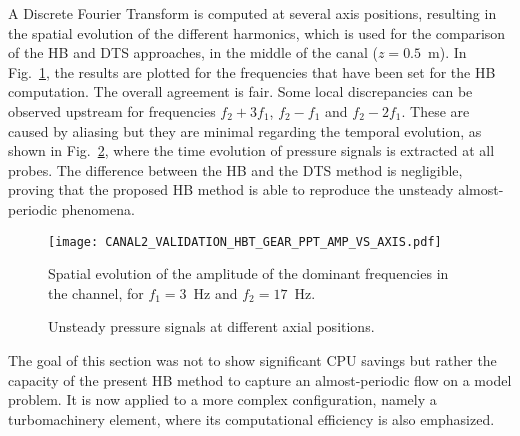 A Discrete Fourier Transform is computed at several axis positions,
resulting in the spatial evolution of the different harmonics, which
is used for the comparison of the HB and DTS approaches, in the middle
of the canal ($z = 0.5$~m).  In
Fig.~\ref{fig:canal2_validation_hbt_gear_amp_vs_axis}, the results are
plotted for the frequencies that have been set for the HB computation.
The overall agreement is fair.  Some local discrepancies can be
observed upstream for frequencies $f_2 + 3f_1$, $f_2 - f_1$ and $f_2 -
2f_1$. These are caused by aliasing
 but they are minimal regarding the temporal evolution, as
shown in Fig.~\ref{fig:canal2_validation_hbt_gear_time_ev}, where the
time evolution of pressure signals is extracted at all probes.  The
difference between the HB and the DTS method is negligible, proving
that the proposed HB method is able to reproduce the unsteady
almost-periodic phenomena.
\begin{figure}[htbp]
  \centering
  \texttt{[image: CANAL2\_VALIDATION\_HBT\_GEAR\_PPT\_AMP\_VS\_AXIS.pdf]}
  \caption{Spatial evolution of the amplitude of the dominant
    frequencies in the channel, for $f_1 = 3$~Hz and $f_2 = 17$~Hz.}
  \label{fig:canal2_validation_hbt_gear_amp_vs_axis}
\end{figure}

\begin{figure}[htb]
  \centering 
   \quad{}
  \caption{Unsteady pressure signals at different axial positions.}
  \label{fig:canal2_validation_hbt_gear_time_ev}
\end{figure}

The goal of this section was not to show significant CPU savings but
rather the capacity of the present HB method to capture an
almost-periodic flow on a model problem.  It is now applied to a more
complex configuration, namely a turbomachinery element, where its
computational efficiency is also emphasized.